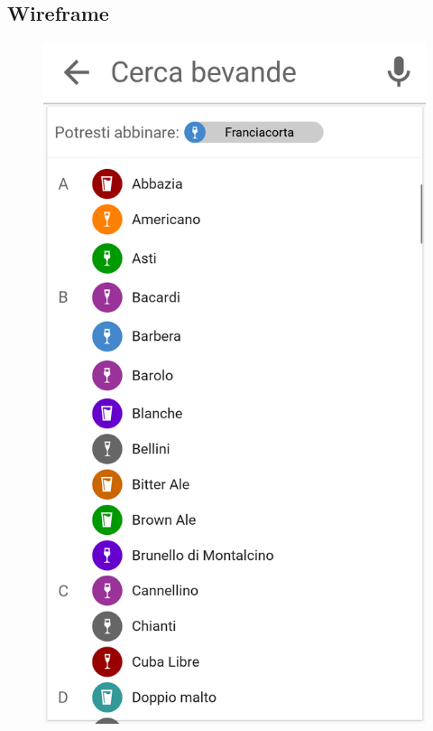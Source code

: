 \subsection{Wireframe}
\begin{figure}[H]
	\begin{minipage}{.49\textwidth}
		\includegraphics[width=\textwidth]{img/wireframe/aggiungi_bevanda_consiglio.png}
	\end{minipage}
	\begin{minipage}{.49\textwidth}

\end{minipage}
\end{figure}
